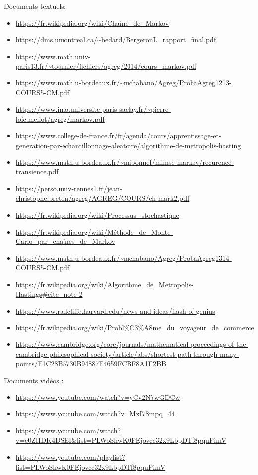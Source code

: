 \documentclass{article}
\begin{document}
Documents textuels:
\begin{itemize}
    \item \url{https://fr.wikipedia.org/wiki/Chaîne_de_Markov}
    \item \url{https://dms.umontreal.ca/~bedard/BergeronL_rapport_final.pdf}
    \item \url{https://www.math.univ-paris13.fr/~tournier/fichiers/agreg/2014/cours_markov.pdf}
    \item \url{https://www.math.u-bordeaux.fr/~mchabano/Agreg/ProbaAgreg1213-COURS5-CM.pdf}
    \item \url{https://www.imo.universite-paris-saclay.fr/~pierre-loic.meliot/agreg/markov.pdf}
    \item \url{https://www.college-de-france.fr/fr/agenda/cours/apprentissage-et-generation-par-echantillonnage-aleatoire/algorithme-de-metropolis-hasting}
    \item \url{https://www.math.u-bordeaux.fr/~mibonnef/mimse-markov/recurence-transience.pdf}
    \item \url{https://perso.univ-rennes1.fr/jean-christophe.breton/agreg/AGREG/COURS/ch-mark2.pdf}
    \item \url{https://fr.wikipedia.org/wiki/Processus_stochastique}
    \item \url{https://fr.wikipedia.org/wiki/Méthode_de_Monte-Carlo_par_chaînes_de_Markov}
    \item \url{https://www.math.u-bordeaux.fr/~mchabano/Agreg/ProbaAgreg1314-COURS5-CM.pdf} \\
    \item \url{https://fr.wikipedia.org/wiki/Algorithme_de_Metropolis-Hastings#cite_note-2}
    \item \url{https://www.radcliffe.harvard.edu/news-and-ideas/flash-of-genius} \\
    \item \url{https://fr.wikipedia.org/wiki/Probl\%C3\%A8me_du_voyageur_de_commerce}
    \item \url{https://www.cambridge.org/core/journals/mathematical-proceedings-of-the-cambridge-philosophical-society/article/abs/shortest-path-through-many-points/F1C28B5730B94887F4659FCBF8A1F2BB} %
\end{itemize}

Documents vidéos :
\begin{itemize}
    \item \url{https://www.youtube.com/watch?v=yCv2N7wGDCw}
    \item \url{https://www.youtube.com/watch?v=MxI78mpq_44}
    \item \url{https://www.youtube.com/watch?v=e0ZHDK4DSEI&list=PLWoShwK0FEjovcc32x9LbpDTf8pquPimV}
    \item \url{https://www.youtube.com/playlist?list=PLWoShwK0FEjovcc32x9LbpDTf8pquPimV} \\
\end{itemize}
\end{document}
